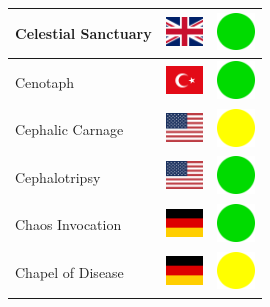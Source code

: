 \documentclass[12pt, a4paper, twoside]{report}
\begin{document}
\begin{center}
\begin{longtable}{|p{5cm}|p{2cm}|p{2cm}|}
 Celestial Sanctuary                                        & \includegraphics[width=1cm]{../img/flags/gb} &   \includegraphics[width=1cm]{../likes/y} \\ \hline
 Cenotaph                                                   & \includegraphics[width=1cm]{../img/flags/tr} &   \includegraphics[width=1cm]{../likes/y} \\ \hline
 Cephalic Carnage                                           & \includegraphics[width=1cm]{../img/flags/us} &   \includegraphics[width=1cm]{../likes/m} \\ \hline
 Cephalotripsy                                              & \includegraphics[width=1cm]{../img/flags/us} &   \includegraphics[width=1cm]{../likes/y} \\ \hline
 Chaos Invocation                                           & \includegraphics[width=1cm]{../img/flags/de} &   \includegraphics[width=1cm]{../likes/y} \\ \hline
 Chapel of Disease                                          & \includegraphics[width=1cm]{../img/flags/de} &   \includegraphics[width=1cm]{../likes/m} \\ \hline

\end{longtable}
\end{center}
\end{document}
